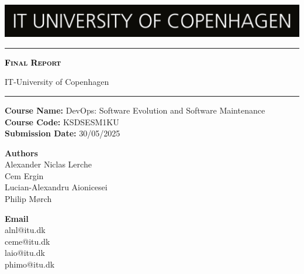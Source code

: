 \begin{titlepage}

\centering
\includegraphics[width=\textwidth]{images/FrontPage/ITU_logo_en.jpg}
	\textcolor{black}{\rule{\linewidth}{1pt}} \par
     {\scshape\Huge\bfseries \textcolor{black}{Final Report}\par} 
	\vspace{1pt} 
	IT-University of Copenhagen
	\textcolor{black}{\rule{\linewidth}{1pt}} \par
	\vspace*{0.25cm}
 \textbf{Course Name:} DevOps: Software Evolution and Software Maintenance\\
\textbf{Course Code:} KSDSESM1KU\\
\textbf{Submission Date:} 30/05/2025\\
 
\vspace*{1cm}
 
\begin{minipage}{0.75\textwidth}
    \begin{flushleft}
        \textbf{Authors}\\
        Alexander Niclas Lerche\\
        Cem Ergin\\
        Lucian-Alexandru Aionicesei\\
        Philip Mørch
    \end{flushleft}
    \end{minipage}
    \begin{minipage}{0.20\textwidth}
    \begin{flushright}
        \textbf{Email}\\
        alnl@itu.dk\\
        ceme@itu.dk\\
        laio@itu.dk\\
        phimo@itu.dk
    \end{flushright}
\end{minipage}

\end{titlepage}
